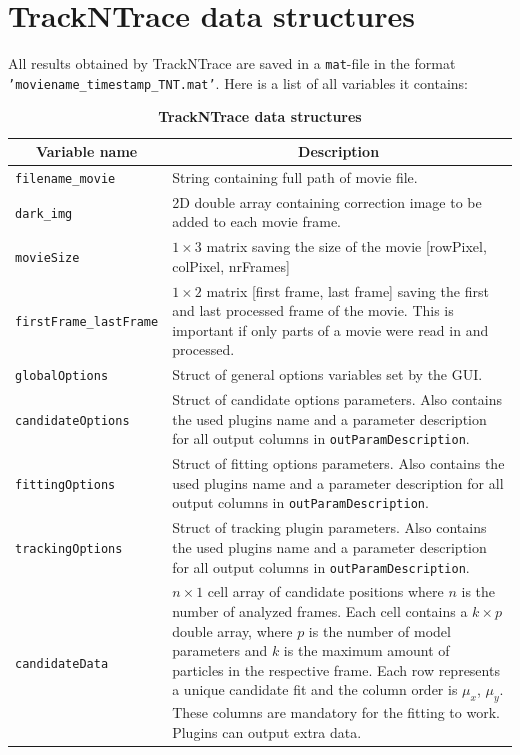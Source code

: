 \documentclass[11pt,onside]{report}
\numberwithin{equation}{chapter}
\begin{document}
\section{TrackNTrace data structures}\label{sec:datastructures}
All results obtained by TrackNTrace are saved in a \texttt{mat}-file in the format \texttt{'moviename\_timestamp\_TNT.mat'}. Here is a list of all variables it contains:
\begin{table}[!h]
\centering
\caption*{\textbf{TrackNTrace data structures}}
\label{tab:datastruct}
\begin{tabular}{p{} p{}}
\toprule
\multicolumn{1}{c}{Variable name} & \multicolumn{1}{c}{Description}\\ \midrule
\texttt{filename\_movie} & String containing full path of movie file. \\[5pt]
\texttt{dark\_img} & 2D double array containing correction image to be added to each movie frame. \\[5pt]
\texttt{movieSize} & $1\times3$ matrix saving the size of the movie [rowPixel, colPixel, nrFrames] \\[5pt]
\texttt{firstFrame\_lastFrame} & $1\times2$ matrix [first frame, last frame] saving the first and last processed frame of the movie. This is important if only parts of a movie were read in and processed. \\[5pt]
\texttt{globalOptions} & Struct of general options variables set by the GUI. \\[5pt]
\texttt{candidateOptions} & Struct of candidate options parameters. Also contains the used plugins name and a parameter description for all output columns in \texttt{outParamDescription}. \\[5pt]
\texttt{fittingOptions} & Struct of fitting options parameters. Also contains the used plugins name and a parameter description for all output columns in \texttt{outParamDescription}. \\[5pt]
\texttt{trackingOptions} & Struct of tracking plugin parameters. Also contains the used plugins name and a parameter description for all output columns in \texttt{outParamDescription}. \\[5pt]
\texttt{candidateData} & $n\times 1$ cell array of candidate positions where $n$ is the number of analyzed frames. Each cell contains a $k\times p$ double array, where $p$ is the number of model parameters and $k$ is the maximum amount of particles in the respective frame. Each row represents a unique candidate fit and the column order is $\mu_x$, $\mu_y$. These columns are mandatory for the fitting to work. Plugins can output extra data.\\

\end{tabular}
\end{table}
\end{document}
